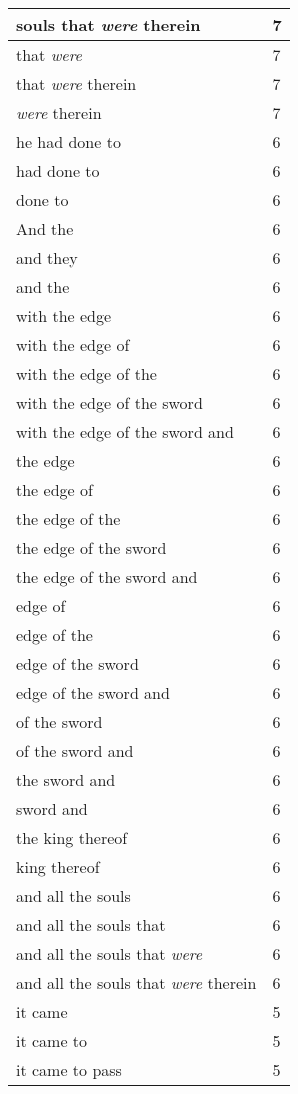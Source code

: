 \begin{center}
\begin{longtable}{|p{3.0in}|p{0.5in}|}
souls that \emph{were} therein & 7\\ \hline 
that \emph{were} & 7\\ \hline 
that \emph{were} therein & 7\\ \hline 
\emph{were} therein & 7\\ \hline 
he had done to & 6\\ \hline 
had done to & 6\\ \hline 
done to & 6\\ \hline 
And the & 6\\ \hline 
and they & 6\\ \hline 
and the & 6\\ \hline 
with the edge & 6\\ \hline 
with the edge of & 6\\ \hline 
with the edge of the & 6\\ \hline 
with the edge of the sword & 6\\ \hline 
with the edge of the sword and & 6\\ \hline 
the edge & 6\\ \hline 
the edge of & 6\\ \hline 
the edge of the & 6\\ \hline 
the edge of the sword & 6\\ \hline 
the edge of the sword and & 6\\ \hline 
edge of & 6\\ \hline 
edge of the & 6\\ \hline 
edge of the sword & 6\\ \hline 
edge of the sword and & 6\\ \hline 
of the sword & 6\\ \hline 
of the sword and & 6\\ \hline 
the sword and & 6\\ \hline 
sword and & 6\\ \hline 
the king thereof & 6\\ \hline 
king thereof & 6\\ \hline 
and all the souls & 6\\ \hline 
and all the souls that & 6\\ \hline 
and all the souls that \emph{were} & 6\\ \hline 
and all the souls that \emph{were} therein & 6\\ \hline 
it came & 5\\ \hline 
it came to & 5\\ \hline 
it came to pass & 5\\ \hline 

\end{longtable}
\end{center}
